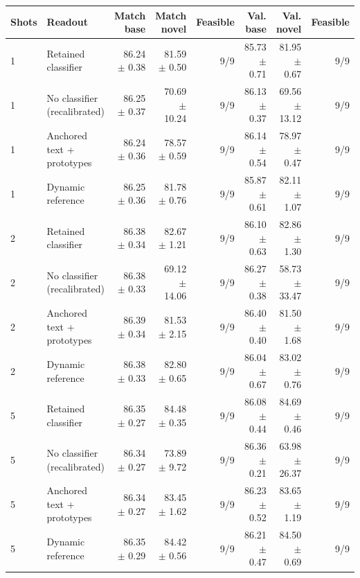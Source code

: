 \begin{tabular}{llrrrrrr}
\toprule
Shots & Readout & Match base & Match novel & Feasible & Val. base & Val. novel & Feasible \\
\midrule
1 & Retained classifier & 86.24 $\pm$ 0.38 & 81.59 $\pm$ 0.50 & 9/9 & 85.73 $\pm$ 0.71 & 81.95 $\pm$ 0.67 & 9/9 \\
1 & No classifier (recalibrated) & 86.25 $\pm$ 0.37 & 70.69 $\pm$ 10.24 & 9/9 & 86.13 $\pm$ 0.37 & 69.56 $\pm$ 13.12 & 9/9 \\
1 & Anchored text + prototypes & 86.24 $\pm$ 0.36 & 78.57 $\pm$ 0.59 & 9/9 & 86.14 $\pm$ 0.54 & 78.97 $\pm$ 0.47 & 9/9 \\
1 & Dynamic reference & 86.25 $\pm$ 0.36 & 81.78 $\pm$ 0.76 & 9/9 & 85.87 $\pm$ 0.61 & 82.11 $\pm$ 1.07 & 9/9 \\
\midrule
2 & Retained classifier & 86.38 $\pm$ 0.34 & 82.67 $\pm$ 1.21 & 9/9 & 86.10 $\pm$ 0.63 & 82.86 $\pm$ 1.30 & 9/9 \\
2 & No classifier (recalibrated) & 86.38 $\pm$ 0.33 & 69.12 $\pm$ 14.06 & 9/9 & 86.27 $\pm$ 0.38 & 58.73 $\pm$ 33.47 & 9/9 \\
2 & Anchored text + prototypes & 86.39 $\pm$ 0.34 & 81.53 $\pm$ 2.15 & 9/9 & 86.40 $\pm$ 0.40 & 81.50 $\pm$ 1.68 & 9/9 \\
2 & Dynamic reference & 86.38 $\pm$ 0.33 & 82.80 $\pm$ 0.65 & 9/9 & 86.04 $\pm$ 0.67 & 83.02 $\pm$ 0.76 & 9/9 \\
\midrule
5 & Retained classifier & 86.35 $\pm$ 0.27 & 84.48 $\pm$ 0.35 & 9/9 & 86.08 $\pm$ 0.44 & 84.69 $\pm$ 0.46 & 9/9 \\
5 & No classifier (recalibrated) & 86.34 $\pm$ 0.27 & 73.89 $\pm$ 9.72 & 9/9 & 86.36 $\pm$ 0.21 & 63.98 $\pm$ 26.37 & 9/9 \\
5 & Anchored text + prototypes & 86.34 $\pm$ 0.27 & 83.45 $\pm$ 1.62 & 9/9 & 86.23 $\pm$ 0.52 & 83.65 $\pm$ 1.19 & 9/9 \\
5 & Dynamic reference & 86.35 $\pm$ 0.29 & 84.42 $\pm$ 0.56 & 9/9 & 86.21 $\pm$ 0.47 & 84.50 $\pm$ 0.69 & 9/9 \\
\bottomrule
\end{tabular}
